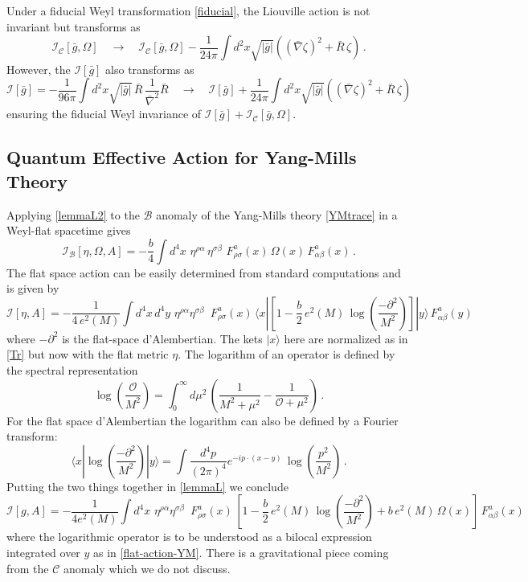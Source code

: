 \documentclass[12pt,a4paper]{article}
\newcommand{\be}{\begin{equation}}
\newcommand{\ee}{\end{equation}}
\newcommand{\cB}{\mathcal{B}}
\newcommand{\cC}{\mathcal{C}}
\newcommand{\cI}{\mathcal{I}}
\newcommand{\cO}{\mathcal{O}}
\renewcommand{\a}{\alpha}
\renewcommand{\b}{\beta}
\newcommand{\m}{\mu}
\renewcommand{\r}{\rho}
\newcommand{\s}{\sigma}
\renewcommand{\O}{\Omega}
\newcommand{\1}{{\textbf{1}}}
\newcommand{\+}{{\,+ \,}}
\begin{document}
Under a fiducial Weyl transformation \eqref{fiducial}, the Liouville action is not invariant but transforms as
\be
\cI_{\cC}[\bar g, \O]\quad  \rightarrow\quad  \cI_{\cC}[\bar g, \O] -\frac{1}{24\pi}\int d^2x \sqrt{|\bar g|}\left((\bar\nabla\zeta)^2+\bar R\,\zeta\right)\, .
\ee
However, the  $\cI[\bar g]$ also transforms as
\be
\cI[\bar g]= -\frac{1}{96\pi}\int d^2x\sqrt{|\bar g|}\,\bar R\,\frac{1}{\bar \nabla^{2}}\bar R \quad  \rightarrow\quad \cI[\bar g] + \frac{1}{24\pi}\int d^2x \sqrt{|\bar g|}\left((\bar\nabla\zeta)^2+\bar R\,\zeta\right)
\ee
ensuring the fiducial Weyl invariance of $\cI[\bar g] + \cI_{\cC}[\bar g, \Omega]$.  

\subsection{Quantum  Effective Action for Yang-Mills Theory\label{YM}}

Applying \eqref{lemmaL2} to  the $\cB$ anomaly of the Yang-Mills theory \eqref{YMtrace} in a Weyl-flat spacetime gives
\be\label{anomaly-action-YM}
\cI_{\cB}[\eta,\O, A] =-  \frac{b }{4}\int d^{4}x \,  \,  \eta^{\r\a}\, \eta^{\s\b} \, \,  F^{a}_{\r\s}(x)  \, \Omega (x) \, F^{a}_{\a\b}(x)\, .
\ee
The flat space action can be easily determined from standard computations and is given by
\be\label{flat-action-YM}
\cI[\eta, A] =  - \frac{1 }{4\,e^{2}(M)}\int d^{4}x \,d^{4}y  \,  \,  \eta^{\r\a} \eta^{\s\b} \, \, \,   F^{a}_{\r\s}(x)  \, \langle x |\left[1 -\frac{b}{2}\,e^2(M)\, \log \left(\frac{-\partial^{2}}{M^{2}}\right) \right] |y \rangle \, F^{a}_{\a\b}(y)
\ee 
where $-\partial^{2}$ is the flat-space d'Alembertian. The kets  $|x\rangle$ here are normalized as in \eqref{Tr} but now with the flat metric $\eta$. 
The logarithm of  an operator is defined by the spectral representation
\be\label{log-operator}
\log \left(\frac{\cO}{M^{2}}\right) = \int_{0}^{\infty}d\m^{2}\, \left( \frac{1}{M^{2} + \m^{2}}- \frac{1}{\cO + \m^{2}} \right) \, .
\ee
For the flat space d'Alembertian the logarithm can also be defined by a  Fourier transform:
\be
\langle x |\log \left(\frac{-\partial^{2}}{M^{2}}\right) |y\rangle= \int \frac{d^{4 }p}{(2\pi)^{4}}e^{-i p \cdot (x -y)}\, \log \left(\frac{p^{2}}{M^{2}}\right)\, .
\ee
Putting the two things together in \eqref{lemmaL} we conclude
\be\label{curved-action-YM}
\cI[g, A] =  - \frac{1 }{4e^{2}(M)}\int d^{4}x \,  \,  \eta^{\r\a} \eta^{\s\b} \, \, \,   F^{a}_{\r\s}(x)  \, \left[1 - \frac{b}{2}\,e^2(M)\, \log \left(\frac{-\partial^{2}}{M^{2}}\right)  +b\, e^2(M) \,\Omega(x) \right]\, F^{a}_{\a\b}(x)
\ee 
where the logarithmic operator is to be understood as a bilocal expression  integrated over $y$ as in \eqref{flat-action-YM}. 
There is a  gravitational piece coming from the $\cC$ anomaly which we do not discuss. 
\end{document}
